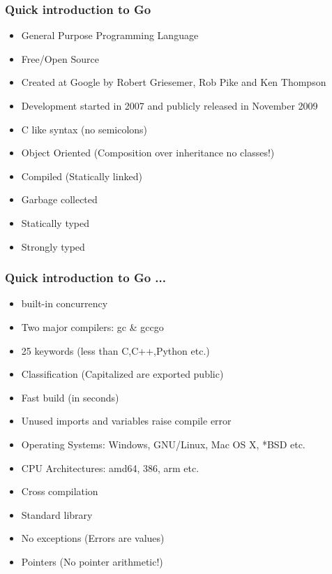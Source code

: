\documentclass[aspectratio=169]{beamer}
\begin{document}
\begin{frame}
  \frametitle{Quick introduction to Go}

  \begin{itemize}
  \item<1-> General Purpose Programming Language
  \item<2-> Free/Open Source
  \item<3-> Created at Google by Robert Griesemer, Rob Pike and Ken Thompson
  \item<4-> Development started in 2007 and publicly released in November 2009
  \item<5-> C like syntax (no semicolons)
  \item<6-> Object Oriented (Composition over inheritance \- no classes!)
  \item<7-> Compiled (Statically linked)
  \item<8-> Garbage collected
  \item<9-> Statically typed
  \item<10-> Strongly typed

  \end{itemize}

\end{frame}
    
\begin{frame}
  \frametitle{Quick introduction to Go ...}
    
  \begin{itemize}
  \item<1-> built-in concurrency
  \item<2-> Two major compilers: gc \& gccgo
  \item<3-> 25 keywords (less than C,C++,Python etc.)
  \item<4-> Classification (Capitalized are exported \- public)
  \item<5-> Fast build (in seconds)
  \item<6-> Unused imports and variables raise compile error
  \item<7-> Operating Systems: Windows, GNU/Linux, Mac OS X, *BSD etc.
  \item<8-> CPU Architectures: amd64, 386, arm etc.
  \item<9-> Cross compilation
  \item<10-> Standard library
  \item<11-> No exceptions (Errors are values)
  \item<12-> Pointers (No pointer arithmetic!)

  \end{itemize}

\end{frame}
\end{document}

